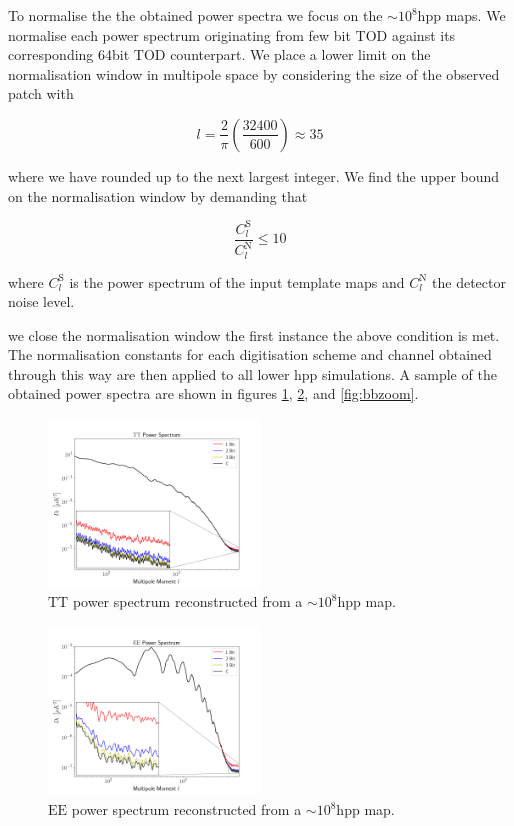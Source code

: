 \documentclass[apj]{emulateapj}
\begin{document}
To normalise the the obtained power spectra we focus on the $\sim 10^8 \mathrm{hpp}$ maps. We normalise each power spectrum originating from few bit TOD against its corresponding 64bit TOD counterpart. We place a lower limit on the normalisation window in multipole space by considering the size of the observed patch with

\[ l = \frac{2}{\pi} \left( \frac{32400}{600} \right) \approx 35 \]

where we have rounded up to the next largest integer. We find the upper bound on the normalisation window by demanding that

\[ \frac{C_l^{\mathrm{S}}}{C_l^{\mathrm{N}}} \leq 10 \]

where $C_l^{\mathrm{S}}$ is the power spectrum of the input template maps and $C_l^{\mathrm{N}}$ the detector noise level.

we close the normalisation window the first instance the above condition is met. The normalisation constants for each digitisation scheme and channel obtained through this way are then applied to all lower hpp simulations. A sample of the obtained power spectra are shown in figures \ref{fig:ttzoom}, \ref{fig:eezoom}, and \ref{fig:bbzoom}.

\begin{figure}[htb]\centering
\includegraphics[width=0.5\textwidth,clip]{Plots/ttzoom.png}
  \caption[Current ]{
  $\mathrm{TT}$ power spectrum reconstructed from a $\sim 10^8\mathrm{hpp}$ map.
           \label{fig:ttzoom}
  }
\end{figure}

\begin{figure}[htb]\centering
\includegraphics[width=0.5\textwidth,clip]{Plots/eezoom.png}
  \caption[Current ]{
  $\mathrm{EE}$ power spectrum reconstructed from a $\sim 10^8\mathrm{hpp}$ map.
\label{fig:eezoom}
}
\end{figure}
\end{document}
